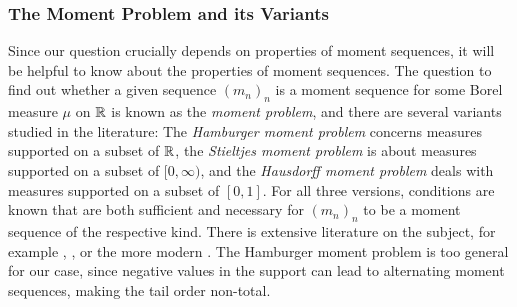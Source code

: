 \documentclass[a4paper]{scrreprt}
\begin{document}
    \subsubsection{The Moment Problem and its Variants}
    Since our question crucially depends on properties of moment sequences, it will be helpful to know about the properties of moment sequences.
    The question to find out whether a given sequence $(m_n)_n$ is a moment sequence for some Borel measure $\mu$ on $\mathbb{R}$ is known as the \emph{moment problem}, and there are several variants studied in the literature:
    The \emph{Hamburger moment problem} concerns measures supported on a subset of $\mathbb{R}$, the \emph{Stieltjes moment problem} is about measures supported on a subset of $[0, \infty)$,
    and the \emph{Hausdorff moment problem} deals with measures supported on a subset of $[0, 1]$. For all three versions, conditions are known that are both sufficient and necessary for $(m_n)_n$ to be a moment sequence of the respective kind.
    There is extensive literature on the subject, for example \cite{bib:shohatTheProblemOfMoments}, \cite{bib:akhiezerClassicalMomentProblem}, or the more modern \cite{bib:schmuedgenTheMomentProblem}.
    The Hamburger moment problem is too general for our case, since negative values in the support can lead to alternating moment sequences, making the tail order non-total.
%    
\end{document}
